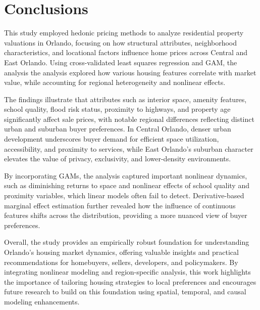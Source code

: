 \section*{Conclusions}

This study employed hedonic pricing methods to analyze residential property valuations in Orlando, focusing on how structural attributes, neighborhood characteristics, and locational factors influence home prices across Central and East Orlando. Using cross-validated least squares regression and GAM, the analysis the analysis explored how various housing features correlate with market value, while accounting for regional heterogeneity and nonlinear effects.

The findings illustrate that attributes such as interior space, amenity features, school quality, flood risk status, proximity to highways, and property age significantly affect sale prices, with notable regional differences reflecting distinct urban and suburban buyer preferences. In Central Orlando, denser urban development underscores buyer demand for efficient space utilization, accessibility, and proximity to services, while East Orlando’s suburban character elevates the value of privacy, exclusivity, and lower-density environments.

By incorporating GAMs, the analysis captured important nonlinear dynamics, such as diminishing returns to space and nonlinear effects of school quality and proximity variables, which linear models often fail to detect. Derivative-based marginal effect estimation further revealed how the influence of continuous features shifts across the distribution, providing a more nuanced view of buyer preferences.


Overall, the study provides an empirically robust foundation for understanding Orlando’s housing market dynamics, offering valuable insights and practical recommendations for homebuyers, sellers, developers, and policymakers. By integrating nonlinear modeling and region-specific analysis, this work highlights the importance of tailoring housing strategies to local preferences and encourages future research to build on this foundation using spatial, temporal, and causal modeling enhancements.


